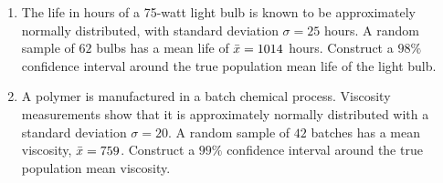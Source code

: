 \documentclass{book}
\begin{document}
\begin{enumerate}
    \item The life in hours of a 75-watt light bulb is known to be approximately normally distributed, with standard deviation $\sigma=25$ hours. A random sample of $62$ bulbs has a mean life of $\Bar{x}=1014$ hours. Construct a $98\%$ confidence interval around the true population mean life of the light bulb.
    \item A polymer is manufactured in a batch chemical process. Viscosity measurements show that it is approximately normally distributed with a standard deviation $\sigma=20$. A random sample of $42$ batches has a mean viscosity, $\Bar{x}=759$. Construct a $99\%$ confidence interval around the true population mean viscosity.
\end{enumerate}
\end{document}
